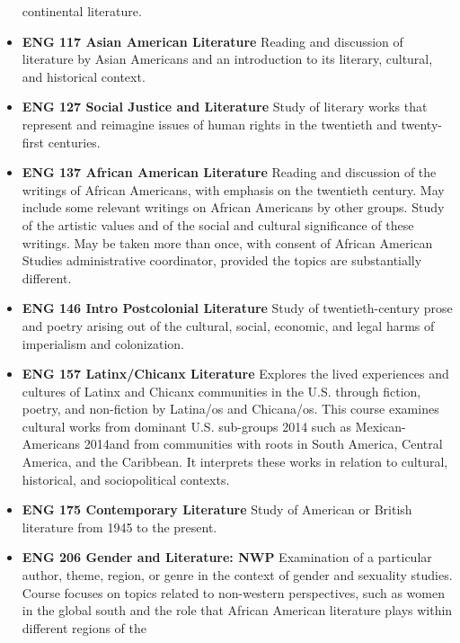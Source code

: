\documentclass[
  letterpaper,
]{scrbook}
\begin{document}
\begin{itemize}
  continental literature.\\
\item
  \textbf{ENG 117 Asian American Literature} Reading and discussion of
  literature by Asian Americans and an introduction to its literary,
  cultural, and historical context.\\
\item
  \textbf{ENG 127 Social Justice and Literature} Study of literary works
  that represent and reimagine issues of human rights in the twentieth
  and twenty-first centuries.\\
\item
  \textbf{ENG 137 African American Literature} Reading and discussion of
  the writings of African Americans, with emphasis on the twentieth
  century. May include some relevant writings on African Americans by
  other groups. Study of the artistic values and of the social and
  cultural significance of these writings. May be taken more than once,
  with consent of African American Studies administrative coordinator,
  provided the topics are substantially different.\\
\item
  \textbf{ENG 146 Intro Postcolonial Literature} Study of
  twentieth-century prose and poetry arising out of the cultural,
  social, economic, and legal harms of imperialism and colonization.\\
\item
  \textbf{ENG 157 Latinx/Chicanx Literature} Explores the lived
  experiences and cultures of Latinx and Chicanx communities in the U.S.
  through fiction, poetry, and non-fiction by Latina/os and Chicana/os.
  This course examines cultural works from dominant U.S. sub-groups 2014
  such as Mexican-Americans 2014and from communities with roots in South
  America, Central America, and the Caribbean. It interprets these works
  in relation to cultural, historical, and sociopolitical contexts.\\
\item
  \textbf{ENG 175 Contemporary Literature} Study of American or British
  literature from 1945 to the present.\\
\item
  \textbf{ENG 206 Gender and Literature: NWP} Examination of a
  particular author, theme, region, or genre in the context of gender
  and sexuality studies. Course focuses on topics related to non-western
  perspectives, such as women in the global south and the role that
  African American literature plays within different regions of the

\end{itemize}
\end{document}

